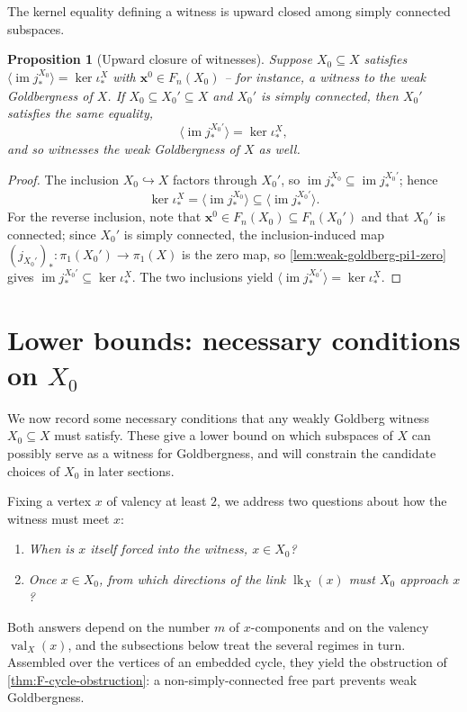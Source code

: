 \documentclass[reqno]{amsart}
\newtheorem{proposition}[theorem]{Proposition}
\theoremstyle{definition}
\newcommand\bfx{\mathbf{x}}
\newcommand{\im}{\operatorname{im}}
\newcommand{\co}[1]{\mathopen{\langle}#1\mathclose{\rangle}} %
\newcommand{\base}{\bfx^0}
\DeclareMathOperator{\lk}{lk}
\DeclareMathOperator{\val}{val}
\numberwithin{equation}{section}
\begin{document}
The kernel equality defining a witness is upward closed among
simply connected subspaces.

\begin{proposition}[Upward closure of witnesses]
\label{prop:witness-upward}
Suppose \(X_0\subseteq X\) satisfies
\(\co{\im j_\ast^{X_0}}=\ker\iota_\ast^X\) with \(\base\in F_n(X_0)\) --
for instance, a witness to the weak Goldbergness of \(X\). If
\(X_0\subseteq X_0'\subseteq X\) and \(X_0'\) is simply connected,
then \(X_0'\) satisfies the same equality,
\[
\co{\im j_\ast^{X_0'}}=\ker\iota_\ast^X,
\]
and so witnesses the weak Goldbergness of \(X\) as well.
\end{proposition}

\begin{proof}
The inclusion \(X_0\hookrightarrow X\) factors through \(X_0'\), so
\(\im j_\ast^{X_0}\subseteq\im j_\ast^{X_0'}\); hence
\[
\ker\iota_\ast^X=\co{\im j_\ast^{X_0}}\subseteq\co{\im j_\ast^{X_0'}}.
\]
For the reverse inclusion, note that \(\base\in F_n(X_0)\subseteq
F_n(X_0')\) and that \(X_0'\) is connected; since \(X_0'\) is simply
connected, the inclusion-induced map
\((j_{X_0'})_\ast\colon\pi_1(X_0')\to\pi_1(X)\) is the zero map, so
\cref{lem:weak-goldberg-pi1-zero} gives
\(\im j_\ast^{X_0'}\subseteq\ker\iota_\ast^X\). The two inclusions
yield \(\co{\im j_\ast^{X_0'}}=\ker\iota_\ast^X\).
\end{proof}


\section{Lower bounds: necessary conditions on \(X_0\)}
\label{sec:lower-bound}

We now record some necessary conditions that any weakly Goldberg
witness \(X_0\subseteq X\) must satisfy. These give a lower bound
on which subspaces of \(X\) can possibly serve as a witness for
Goldbergness, and will constrain the candidate choices of \(X_0\)
in later sections.

Fixing a vertex \(x\) of valency at least \(2\), we address two
questions about how the witness must meet \(x\):
\begin{enumerate}[label=\textup{(\roman*)},leftmargin=2.4em]
  \item \emph{When is \(x\) itself forced into the witness,
        \(x\in X_0\)?}
  \item \emph{Once \(x\in X_0\), from which directions of the link
        \(\lk_X(x)\) must \(X_0\) approach \(x\)?}
\end{enumerate}
Both answers depend on the number \(m\) of \(x\)-components and on
the valency \(\val_X(x)\), and the subsections below treat the
several regimes in turn. Assembled over the vertices of an embedded
cycle, they yield the obstruction of
\cref{thm:F-cycle-obstruction}: a non-simply-connected free part
prevents weak Goldbergness.
\end{document}
